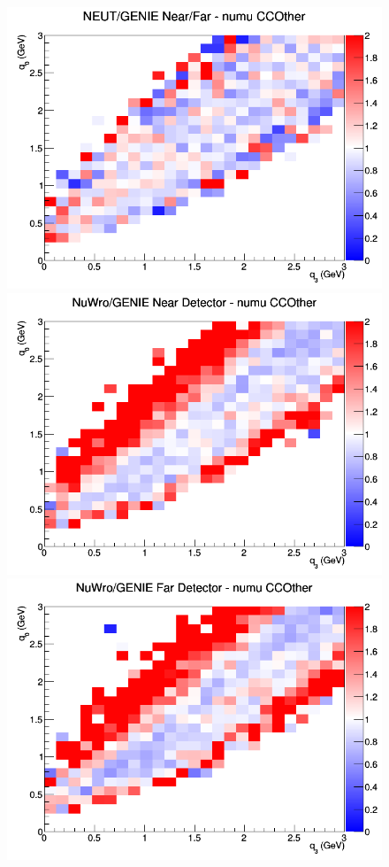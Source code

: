 \documentclass[12pt]{article}
\begin{document}
\begin{figure}[h]
\endminipage
{}
\includegraphics[width=\linewidth]{eff_q0_q3/GAr/ratios/CCOther_NEUT_GENIE_numu_NF_q3_q0.png}
\endminipage
\newline
{}
\includegraphics[width=\linewidth]{eff_q0_q3/GAr/ratios/CCOther_NuWro_GENIE_numu_near_q3_q0.png}
\endminipage
{}
\includegraphics[width=\linewidth]{eff_q0_q3/GAr/ratios/CCOther_NuWro_GENIE_numu_far_q3_q0.png}

\end{figure}
\end{document}
